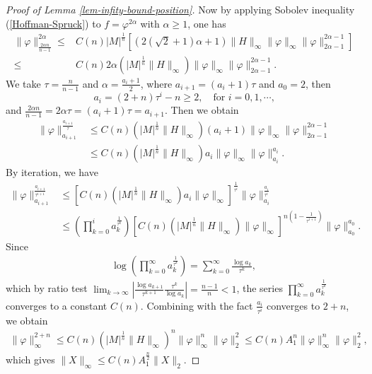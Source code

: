 \documentclass{amsart}
\numberwithin{equation}{section}
\theoremstyle{remark}
\renewcommand{\(}{\left(}
\renewcommand{\)}{\right)}
\renewcommand{\~}{\tilde}
\renewcommand{\-}{\overline}
\renewcommand{\a}{\alpha}
\newcommand{\ra}{\rightarrow}
\begin{document}
\begin{proof}[Proof of Lemma \ref{lem-infity-bound-position}]
	
	Now by applying Sobolev inequality (\ref{Hoffman-Spruck}) to $f=\varphi^{2\a}$ with $\a\geq 1$, one has
	\begin{align*}
	\|\varphi\|_{\frac{2\a n}{n-1}}^{2\a}\leq & C(n)|M|^\frac{1}{n}\left[(2(\sqrt{2}+1)\a+1)\|H\|_\infty\|\varphi\|_\infty\|\varphi\|_{2\a-1}^{2\a-1} \right]\\
	\leq & C(n)2\a \(|M|^\frac{1}{n}\|H\|_\infty\) \|\varphi\|_\infty\|\varphi\|_{2\a-1}^{2\a-1}.
	\end{align*}
	We take $\tau=\frac{n}{n-1}$ and $\a=\frac{a_i+1}{2}$, where $a_{i+1}=(a_i+1)\tau$ and $a_0=2$, then
	$$
	a_{i}=(2+n)\tau^{i}-n\geq 2, \quad \text{for $i=0,1,\cdots$,}
	$$
	and $\frac{2\a n}{n-1}=2\a \tau=(a_i+1)\tau=a_{i+1}$. Then we obtain
	\begin{align*}
	\|\varphi\|_{a_{i+1}}^{\frac{a_{i+1}}{\tau}} &\leq  C(n)\(|M|^\frac{1}{n}\|H\|_\infty\) (a_i+1) \|\varphi\|_\infty\|\varphi\|_{2\a-1}^{2\a-1}\\
	&\leq C(n)\(|M|^\frac{1}{n}\|H\|_\infty\) a_i \|\varphi\|_\infty\|\varphi\|_{a_i}^{a_i}.
	\end{align*}
	By iteration, we have
	\begin{align*}
	\|\varphi\|_{a_{i+1}}^{\frac{a_{i+1}}{\tau^{i+1}}} &\leq \left[C(n)\(|M|^\frac{1}{n}\|H\|_\infty\) a_i \|\varphi\|_\infty\right]^{\frac{1}{\tau^i}}\|\varphi\|_{a_i}^{\frac{a_i}{\tau^i}} \\
	&\leq \(\prod_{k=0}^{i} a_k^{\frac{1}{\tau^k}}\)\left[ C(n)\(|M|^\frac{1}{n}\|H\|_\infty\)  \|\varphi\|_\infty\right]^{n\(1-\frac{1}{\tau^{i+1}}\)}\|\varphi\|_{a_0}^{a_0}.
	\end{align*}
	Since
	\begin{align*}
	\log\(\prod_{k=0}^{\infty} a_k^{\frac{1}{\tau^k}}\)=\sum_{k=0}^{\infty}\frac{\log a_k}{\tau^k},
	\end{align*}
	which by ratio test $\lim_{k\ra \infty}\left|\frac{\log a_{k+1}}{\tau^{k+1}}\frac{\tau^k}{\log a_k} \right|=\frac{n-1}{n}<1$, the series $\prod_{k=0}^{\infty} a_k^{\frac{1}{\tau^k}}$ converges to a constant $C(n)$. Combining with the fact $\frac{a_i}{\tau^i}$ converges to $2+n$, we obtain
	\begin{align*}
	\|\varphi\|_\infty^{2+n} \leq C(n)\(|M|^\frac{1}{n}\|H\|_\infty\)^n \|\varphi\|_\infty^n \|\varphi\|_2^2\leq C(n)A_1^n \|\varphi\|_\infty^n \|\varphi\|_2^2,
	\end{align*}
	which gives $\|X\|_\infty\leq C(n)A_1^{\frac{n}{2}} \|X\|_2$.
\end{proof}
\end{document}
